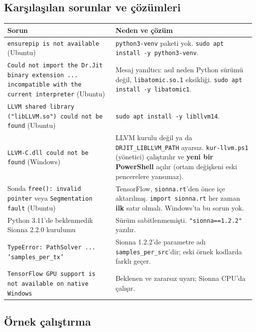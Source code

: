 \subsection*{Karşılaşılan sorunlar ve çözümleri}
\begingroup\sffamily\small
\begin{xltabular}{\textwidth}{@{}p{4.4cm}X@{}}
\toprule
\textbf{Sorun} & \textbf{Neden ve çözüm} \\
\midrule
\texttt{ensurepip is not available} (Ubuntu) & \texttt{python3-venv} paketi yok. \texttt{sudo apt install -y python3-venv}. \\
\texttt{Could not import the Dr.Jit binary extension ... incompatible with the current interpreter} (Ubuntu) & Mesaj yanıltıcı: asıl neden Python sürümü değil, \texttt{libatomic.so.1} eksikliği. \texttt{sudo apt install -y libatomic1}. \\
\texttt{LLVM shared library ("libLLVM.so") could not be found} (Ubuntu) & \texttt{sudo apt install -y libllvm14}. \\
\texttt{LLVM-C.dll could not be found} (Windows) & LLVM kurulu değil ya da \texttt{DRJIT\_LIBLLVM\_PATH} ayarsız. \texttt{kur-llvm.ps1} (yönetici) çalıştırılır ve \textbf{yeni bir PowerShell} açılır (ortam değişkeni eski pencerelere yansımaz). \\
Sonda \texttt{free(): invalid pointer} veya \texttt{Segmentation fault} (Ubuntu) & TensorFlow, \texttt{sionna.rt}'den önce içe aktarılmış. \texttt{import sionna.rt} her zaman \textbf{ilk} satır olmalı. Windows'ta bu sorun yok. \\
Python 3.11'de beklenmedik Sionna 2.2.0 kurulumu & Sürüm sabitlenmemişti. \texttt{"sionna==1.2.2"} yazılır. \\
\texttt{TypeError: PathSolver ... 'samples\_per\_tx'} & Sionna 1.2.2'de parametre adı \texttt{samples\_per\_src}'dir; eski örnek kodlarda farklı geçer. \\
\texttt{TensorFlow GPU support is not available on native Windows} & Beklenen ve zararsız uyarı; Sionna CPU'da çalışır. \\
\bottomrule
\end{xltabular}
\endgroup

\subsection*{Örnek çalıştırma}
